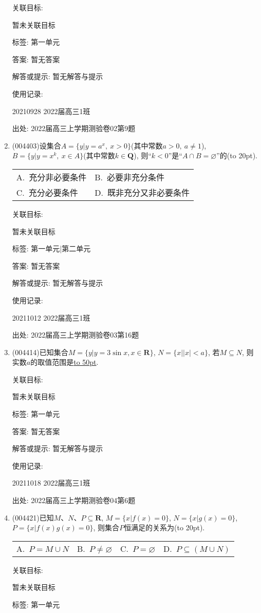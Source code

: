 \documentclass[10pt,a4paper]{article}
\newcommand{\blank}[1]{\underline{\hbox to #1pt{}}}
\newcommand{\bracket}[1]{(\hbox to #1pt{})}
\newcommand{\twoch}[4]{\par\begin{tabular}{p{.46\textwidth}p{.46\textwidth}}
A.~#1& B.~#2\\
C.~#3& D.~#4
\end{tabular}}
\newcommand{\fourch}[4]{\par\begin{tabular}{p{.23\textwidth}p{.23\textwidth}p{.23\textwidth}p{.23\textwidth}}
A.~#1 &B.~#2& C.~#3& D.~#4
\end{tabular}}
\begin{document}
\begin{enumerate}[1.]
关联目标:

暂未关联目标



标签: 第一单元

答案: 暂无答案

解答或提示: 暂无解答与提示

使用记录:

20210928	2022届高三1班	


出处: 2022届高三上学期测验卷02第9题
\item { (004403)}设集合$A=\{y|y=a^x,\ x>0\}$(其中常数$a>0,  \ a\ne 1$), $B=\{y|y=x^k,\ x\in A\}$(其中常数$k\in \mathbf{Q}$), 则``$k<0$''是``$A\cap B=\varnothing$''的\bracket{20}.
\twoch{充分非必要条件}{必要非充分条件}{充分必要条件}{既非充分又非必要条件}


关联目标:

暂未关联目标



标签: 第一单元|第二单元

答案: 暂无答案

解答或提示: 暂无解答与提示

使用记录:

20211012	2022届高三1班	


出处: 2022届高三上学期测验卷03第16题
\item { (004414)}已知集合$M=\{y|y=3\sin x,x\in \mathbf{R}\}$, $N=\{x||x|<a\}$, 若$M\subseteq N$, 则实数$a$的取值范围是\blank{50}.


关联目标:

暂未关联目标



标签: 第一单元

答案: 暂无答案

解答或提示: 暂无解答与提示

使用记录:

20211018	2022届高三1班	


出处: 2022届高三上学期测验卷04第6题
\item { (004421)}已知$M$、$N$、$P\subseteq \mathbf{R}$, $M=\{x|f(x)=0\}$, $N=\{x|g(x)=0\}$, $P=\{x|f(x)g(x)=0\}$, 则集合$P$恒满足的关系为\bracket{20}.
\fourch{$P=M\cup N$}{$P\ne \varnothing$}{$P=\varnothing$}{$P\subseteq (M\cup N)$}


关联目标:

暂未关联目标



标签: 第一单元


\end{enumerate}
\end{document}
